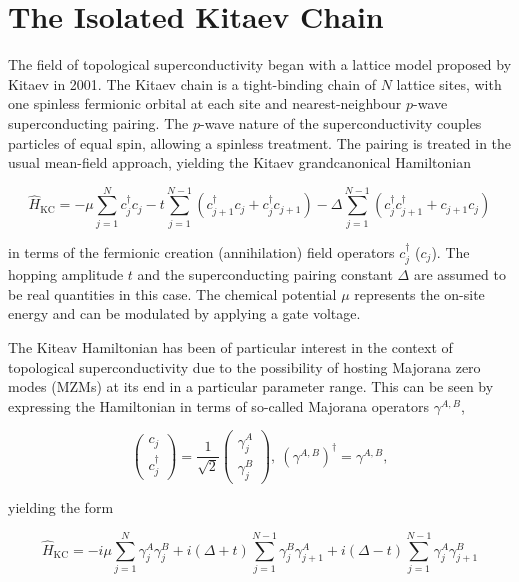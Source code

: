 \section{The Isolated Kitaev Chain}

The field of topological superconductivity began with a lattice model proposed by Kitaev in 2001. The Kitaev chain is a tight-binding chain of $N$ lattice sites, with one spinless fermionic orbital at each site and nearest-neighbour $p$-wave superconducting pairing. The $p$-wave nature of the superconductivity couples particles of equal spin, allowing a spinless treatment. The pairing is treated in the usual mean-field approach, yielding the Kitaev grandcanonical Hamiltonian

\begin{equation}
    \hat{H}_{\text{KC}} = -\mu \sum_{j=1}^{N}c^{\dagger}_{j}c_{j} - t\sum_{j=1}^{N-1}(c^{\dagger}_{j+1}c_{j}+c^{\dagger}_{j}c_{j+1})-\Delta \sum_{j=1}^{N-1}(c^{\dagger}_{j}c^{\dagger}_{j+1}+c_{j+1}c_{j})    
\end{equation}

in terms of the fermionic creation (annihilation) field operators $c^{\dagger}_{j}$ ($c_{j}$). The hopping amplitude $t$ and the superconducting pairing constant $\Delta$ are assumed to be real quantities in this case. The chemical potential $\mu$ represents the on-site energy and can be modulated by applying a gate voltage. \par 

The Kiteav Hamiltonian has been of particular interest in the context of topological superconductivity due to the possibility of hosting Majorana zero modes (MZMs) at its end in a particular parameter range. This can be seen by expressing the Hamiltonian in terms of so-called Majorana operators $\gamma^{A,B}$,

\begin{equation}
    \begin{pmatrix}
        c_{j} \\
        c^{\dagger}_{j}    
    \end{pmatrix} = \frac{1}{\sqrt{2}}
    \begin{pmatrix}
        \gamma^{A}_{j} \\
        \gamma^{B}_{j}    
    \end{pmatrix}, \: (\gamma^{A,B})^{\dagger} = \gamma^{A,B},
\end{equation}

yielding the form

\begin{equation} \label{eq:majorana}
    \hat{H}_{\text{KC}} = -i\mu \sum_{j=1}^{N}\gamma^{A}_{j}\gamma^{B}_{j} + i(\Delta+t)\sum_{j=1}^{N-1}\gamma^{B}_{j}\gamma^{A}_{j+1}+i(\Delta-t)\sum_{j=1}^{N-1}\gamma^{A}_{j}\gamma^{B}_{j+1}  
\end{equation}

